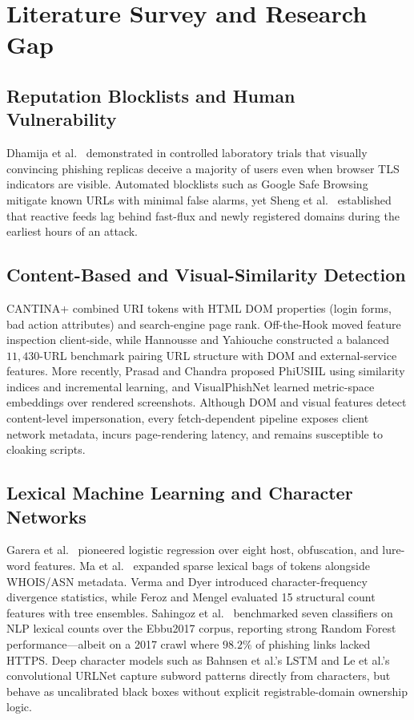 \documentclass[12pt,a4paper]{report}
\begin{document}
\chapter{Literature Survey and Research Gap}

\section{Reputation Blocklists and Human Vulnerability}
Dhamija et al.\ \cite{dhamija2006} demonstrated in controlled laboratory trials that visually convincing phishing replicas deceive a majority of users even when browser TLS indicators are visible. Automated blocklists such as Google Safe Browsing \cite{whittaker2010} mitigate known URLs with minimal false alarms, yet Sheng et al.\ \cite{sheng2009} established that reactive feeds lag behind fast-flux and newly registered domains during the earliest hours of an attack.

\section{Content-Based and Visual-Similarity Detection}
CANTINA+ \cite{xiang2011} combined URI tokens with HTML DOM properties (login forms, bad action attributes) and search-engine page rank. Off-the-Hook \cite{marchal2017} moved feature inspection client-side, while Hannousse and Yahiouche \cite{hannousse2021} constructed a balanced $11{,}430$-URL benchmark pairing URL structure with DOM and external-service features. More recently, Prasad and Chandra \cite{prasad2024} proposed PhiUSIIL using similarity indices and incremental learning, and VisualPhishNet \cite{abdelnabi2020} learned metric-space embeddings over rendered screenshots. Although DOM and visual features detect content-level impersonation, every fetch-dependent pipeline exposes client network metadata, incurs page-rendering latency, and remains susceptible to cloaking scripts.

\section{Lexical Machine Learning and Character Networks}
Garera et al.\ \cite{garera2007} pioneered logistic regression over eight host, obfuscation, and lure-word features. Ma et al.\ \cite{ma2009} expanded sparse lexical bags of tokens alongside WHOIS/ASN metadata. Verma and Dyer \cite{verma2015} introduced character-frequency divergence statistics, while Feroz and Mengel \cite{feroz2015} evaluated 15 structural count features with tree ensembles. Sahingoz et al.\ \cite{sahingoz2019} benchmarked seven classifiers on NLP lexical counts over the Ebbu2017 corpus, reporting strong Random Forest performance---albeit on a 2017 crawl where $98.2\%$ of phishing links lacked HTTPS. Deep character models such as Bahnsen et al.'s LSTM \cite{bahnsen2017} and Le et al.'s convolutional URLNet \cite{le2018} capture subword patterns directly from characters, but behave as uncalibrated black boxes without explicit registrable-domain ownership logic.
\end{document}
